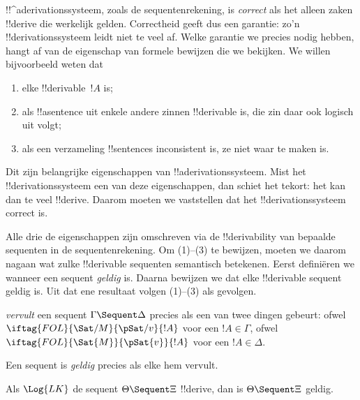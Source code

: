 \documentclass[openany]{memoir}
\begin{document}
      {}
      {}


\begin{explain}
!!^a{derivation}ssysteem, zoals de sequentenrekening, is \emph{correct}
als het alleen zaken !!{derive} die werkelijk gelden. Correctheid geeft
dus een garantie: zo'n !!{derivation}ssysteem leidt niet te veel
af. Welke garantie we precies nodig hebben, hangt af van de eigenschap
van formele bewijzen die we bekijken. We willen bijvoorbeeld weten dat
\begin{enumerate}
\item elke !!{derivable}~$!A$  is;
\item als !!a{sentence} uit enkele andere zinnen !!{derivable}
  is, die zin daar ook logisch uit volgt;
\item als een verzameling !!{sentence}s inconsistent is, ze
  niet waar te maken is.
\end{enumerate}
Dit zijn belangrijke eigenschappen van !!a{derivation}ssysteem. Mist
het !!{derivation}ssysteem een van deze eigenschappen, dan schiet het
tekort: het kan dan te veel !!{derive}. Daarom moeten we vaststellen
dat het !!{derivation}ssysteem correct is.

Alle drie de eigenschappen zijn omschreven via de !!{derivability} van
bepaalde sequenten in de sequentenrekening. Om (1)--(3) te bewijzen,
moeten we daarom nagaan wat zulke !!{derivable} sequenten semantisch
betekenen. Eerst definiëren we wanneer een sequent \emph{geldig} is.
Daarna bewijzen we dat elke !!{derivable} sequent geldig is. Uit dat
ene resultaat volgen (1)--(3) als gevolgen.
\end{explain}

\begin{defn}
 \emph{vervult} een sequent
$\Gamma \Sequent \Delta$ precies als een van twee dingen gebeurt:
ofwel $\iftag{FOL}{\Sat/{M}}{\pSat/{v}}{!A}$ voor een $!A \in \Gamma$,
ofwel $\iftag{FOL}{\Sat{M}}{\pSat{v}}{!A}$ voor een $!A \in \Delta$.

Een sequent is \emph{geldig} precies als elke
hem vervult.
\end{defn}

\begin{thm}[Correctheid]
 Als $\Log{LK}$ de sequent $\Theta
\Sequent \Xi$ !!{derive}, dan is $\Theta \Sequent \Xi$ geldig.
\end{thm}
\end{document}
